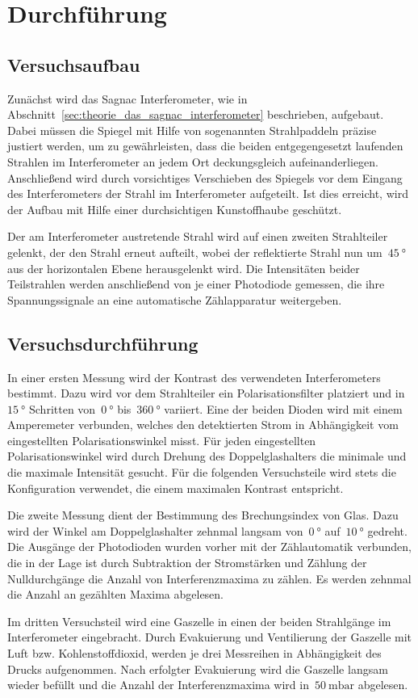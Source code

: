 \section{Durchführung}
\label{sec:durchführung}

\subsection{Versuchsaufbau}
Zunächst wird das Sagnac Interferometer, wie in
Abschnitt~\ref{sec:theorie_das_sagnac_interferometer} beschrieben, aufgebaut.
Dabei müssen die Spiegel mit Hilfe von sogenannten Strahlpaddeln präzise
justiert werden, um zu gewährleisten, dass die beiden entgegengesetzt laufenden
Strahlen im Interferometer an jedem Ort deckungsgleich aufeinanderliegen.
Anschließend wird durch vorsichtiges Verschieben des Spiegels vor dem Eingang
des Interferometers der Strahl im Interferometer aufgeteilt. Ist dies erreicht,
wird der Aufbau mit Hilfe einer durchsichtigen Kunstoffhaube geschützt.

Der am Interferometer austretende Strahl wird auf einen zweiten Strahlteiler
gelenkt, der den Strahl erneut aufteilt, wobei der reflektierte Strahl nun
um~$\SI{45}{\degree}$ aus der horizontalen Ebene herausgelenkt wird. Die
Intensitäten beider Teilstrahlen werden anschließend von je einer Photodiode
gemessen, die ihre Spannungssignale an eine automatische Zählapparatur
weitergeben.

\subsection{Versuchsdurchführung}
In einer ersten Messung wird der Kontrast des verwendeten Interferometers
bestimmt. Dazu wird vor dem Strahlteiler ein Polarisationsfilter platziert und
in~$\SI{15}{\degree}$ Schritten von~$\SI{0}{\degree}$ bis~$\SI{360}{\degree}$
variiert. Eine der beiden Dioden wird mit einem Amperemeter verbunden, welches
den detektierten Strom in Abhängigkeit vom eingestellten Polarisationswinkel
misst. Für jeden eingestellten Polarisationswinkel wird durch Drehung des
Doppelglashalters die minimale und die maximale Intensität gesucht. Für die
folgenden Versuchsteile wird stets die Konfiguration verwendet, die einem
maximalen Kontrast entspricht.

Die zweite Messung dient der Bestimmung des Brechungsindex von Glas. Dazu wird
der Winkel am Doppelglashalter zehnmal langsam von~$\SI{0}{\degree}$
auf~$\SI{10}{\degree}$ gedreht. Die Ausgänge der Photodioden wurden vorher mit
der Zählautomatik verbunden, die in der Lage ist durch Subtraktion der
Stromstärken und Zählung der Nulldurchgänge die Anzahl von Interferenzmaxima zu
zählen. Es werden zehnmal die Anzahl an gezählten Maxima abgelesen.

Im dritten Versuchsteil wird eine Gaszelle in einen der beiden Strahlgänge im
Interferometer eingebracht. Durch Evakuierung und Ventilierung der Gaszelle mit
Luft bzw. Kohlenstoffdioxid, werden je drei Messreihen in Abhängigkeit des
Drucks aufgenommen. Nach erfolgter Evakuierung wird die Gaszelle langsam wieder
befüllt und die Anzahl der Interferenzmaxima wird in~$\SI{50}{\milli\bar}$
abgelesen.
